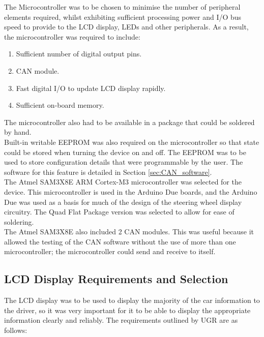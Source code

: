 \documentclass[a4paper,12pt]{article}
\begin{document}
The Microcontroller was to be chosen to minimise the number of peripheral elements required, whilst exhibiting sufficient processing power and I/O bus speed to provide to the LCD display, LEDs and other peripherals. As a result, the microcontroller was required to include:

\begin{enumerate}
  \item Sufficient number of digital output pins.
  \item CAN module.
  \item Fast digital I/O to update LCD display rapidly.
  \item Sufficient on-board memory.
\end{enumerate}

The microcontroller also had to be available in a package that could be soldered by hand. \\

Built-in writable EEPROM was also required on the microcontroller so that state could be stored when turning the device on and off. The EEPROM was to be used to store configuration details that were programmable by the user. The software for this feature is detailed in Section \ref{sec:CAN_software}. \\

The Atmel SAM3X8E ARM Cortex-M3 microcontroller was selected for the device. This microcontroller is used in the Arduino Due boards, and the Arduino Due was used as a basis for much of the design of the steering wheel display circuitry. The Quad Flat Package version was selected to allow for ease of soldering. \\

The Atmel SAM3X8E also included 2 CAN modules. This was useful because it allowed the testing of the CAN software without the use of more than one microcontroller; the microcontroller could send and receive to itself. \\

\subsection{LCD Display Requirements and Selection}
\label{sec:display}

The LCD display was to be used to display the majority of the car information to the driver, so it was very important for it to be able to display the appropriate information clearly and reliably. The requirements outlined by UGR are as follows:
\end{document}
